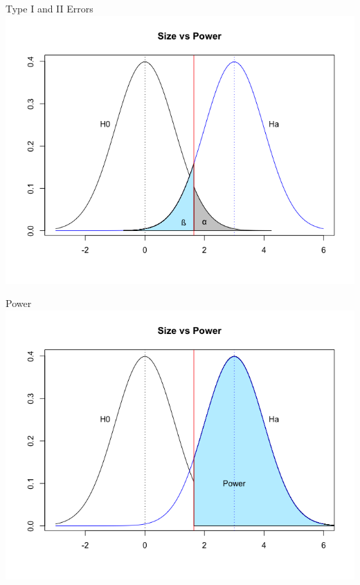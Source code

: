 \documentclass{beamer}
\begin{document}
\begin{frame}{Type I and II Errors}
	\centering\includegraphics[width=.8\textwidth]{sizevspowerab.png}
\end{frame}

\begin{frame}{Power}
	\centering\includegraphics[width=.8\textwidth]{sizevspowerapower.png}
\end{frame}

\end{document}
